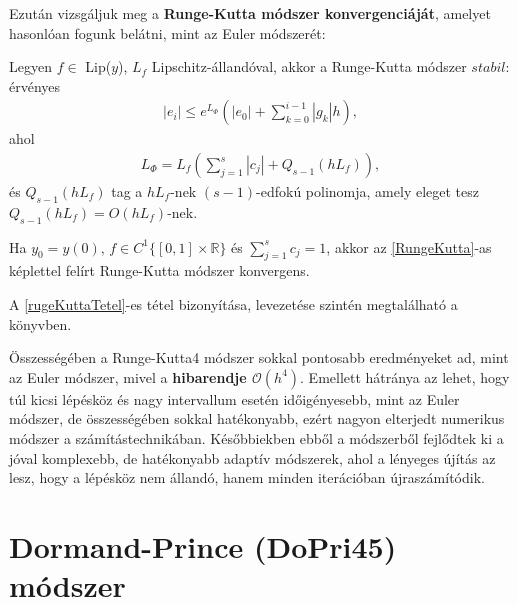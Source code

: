 Ezután vizsgáljuk meg a \textbf{Runge-Kutta módszer konvergenciáját}, amelyet hasonlóan fogunk belátni, mint az Euler módszerét:
\begin{theorem}\label{rugeKuttaTetel}
	Legyen $ f \in $ Lip($ y $), $ L_{f} $ Lipschitz-állandóval, akkor a Runge-Kutta módszer $ stabil $: érvényes
	\begin{align*}
		|e_{i}| \leq e^{L_{\Phi}} \left(|e_{0}| + \displaystyle\sum_{k=0}^{i-1} |g_{k}|h \right),
	\end{align*}
	ahol
	\begin{align*}
		L_{\Phi} = L_{f}\left(\displaystyle\sum_{j=1}^{s} |c_{j}|+Q_{s-1}(hL_{f})\right),
	\end{align*}
	és $ Q_{s-1}(hL_{f}) $ tag a $ hL_{f} $-nek $ (s-1) $-edfokú polinomja, amely eleget tesz $ Q_{s-1}(hL_{f}) = O(hL_{f})$-nek.
\end{theorem}
\begin{conclusion}
	Ha $ y_{0} = y(0) $, $ f \in C^{1} \{[0,1] \times \mathbb{R}\}$ és $ \displaystyle\sum_{j=1}^{s} c_{j} = 1 $, akkor az \eqref{RungeKutta}-as képlettel felírt Runge-Kutta módszer konvergens.
\end{conclusion}
A \ref{rugeKuttaTetel}-es tétel bizonyítása, levezetése szintén megtalálható a \cite{DiffEgyenletesKonyv} könyvben. \newline

Összességében a Runge-Kutta4 módszer sokkal pontosabb eredményeket ad, mint az Euler módszer, mivel a \textbf{hibarendje $\mathcal{O}(h^{4})$}. Emellett hátránya az lehet, hogy túl kicsi lépésköz és nagy intervallum esetén időigényesebb, mint az Euler módszer, de összességében sokkal hatékonyabb, ezért nagyon elterjedt numerikus módszer a számítástechnikában. Későbbiekben ebből a módszerből fejlődtek ki a jóval komplexebb, de hatékonyabb adaptív módszerek, ahol a lényeges újítás az lesz, hogy a lépésköz nem állandó, hanem minden iterációban újraszámítódik.

\section {Dormand-Prince (DoPri45) módszer}


